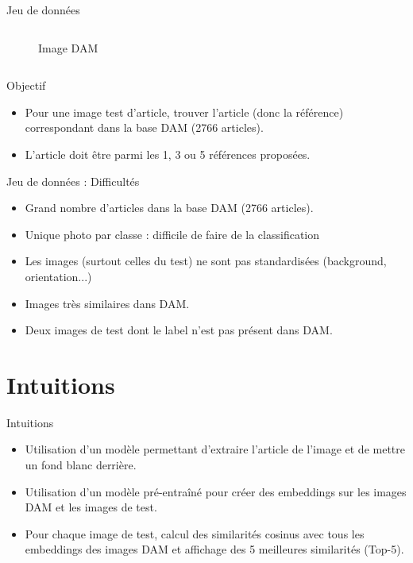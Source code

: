 \documentclass{beamer}
\begin{document}
\begin{frame}{Jeu de données}
\begin{columns}
\begin{figure}
        \caption{Image DAM}
    \end{figure}
\end{columns}
\vspace{0.5cm}
\begin{block}{Objectif}
\begin{itemize}
    \item Pour une image test d'article, trouver l'article (donc la référence) correspondant dans la base DAM (2766 articles).
    \item L'article doit être parmi les 1, 3 ou 5 références proposées.
\end{itemize}
\end{block}
\end{frame}

\begin{frame}{Jeu de données : Difficultés}
\begin{itemize}
    \item Grand nombre d'articles dans la base DAM (2766 articles).
    \item Unique photo par classe : difficile de faire de la classification
    \item Les images (surtout celles du test) ne sont pas standardisées (background, orientation...)
    \item Images très similaires dans DAM.
    \item Deux images de test dont le label n'est pas présent dans DAM.
\end{itemize}
\end{frame}


\section{Intuitions}
\begin{frame}{Intuitions}
\begin{itemize}
    \item Utilisation d'un modèle permettant d'extraire l'article de l'image et de mettre un fond blanc derrière.
    \item Utilisation d'un modèle pré-entraîné pour créer des embeddings sur les images DAM et les images de test.
    \item Pour chaque image de test, calcul des similarités cosinus avec tous les embeddings des images DAM et affichage des 5 meilleures similarités (Top-5).
\end{itemize}
\end{frame}
\end{document}
